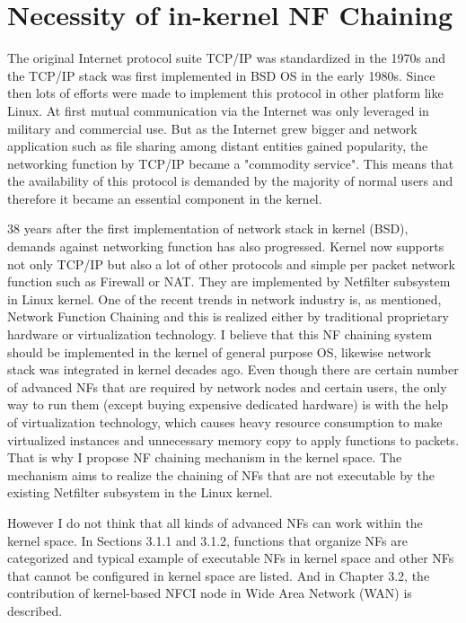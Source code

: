 \section{Necessity of in-kernel NF Chaining}
The original Internet protocol suite TCP/IP was standardized in the 1970s and the TCP/IP stack was first implemented in BSD OS in the early 1980s. Since then lots of efforts were made to implement this protocol in other platform like Linux. At first mutual communication via the Internet was only leveraged in military and commercial use. But as the Internet grew bigger and network application such as file sharing among distant entities gained popularity, the networking function by TCP/IP became a "commodity service". This means that the availability of this protocol is demanded by the majority of normal users and therefore it became an essential component in the kernel. 

 38 years after the first implementation of network stack in kernel (BSD), demands against networking function has also progressed. Kernel now supports not only TCP/IP but also a lot of other protocols and simple per packet network function such as Firewall or NAT. They are implemented by Netfilter subsystem in Linux kernel. One of the recent trends in network industry is, as mentioned, Network Function Chaining and this is realized either by traditional proprietary hardware or virtualization technology. I believe that this NF chaining system should be implemented in the kernel of general purpose OS, likewise network stack was integrated in kernel decades ago. Even though there are certain number of advanced NFs that are required by network nodes and certain users, the only way to run them (except buying expensive dedicated hardware) is with the help of virtualization technology, which causes heavy resource consumption to make virtualized instances and unnecessary memory copy to apply functions to packets. That is why I propose NF chaining mechanism in the kernel space. The mechanism aims to realize the chaining of NFs that are not executable by the existing Netfilter subsystem in the Linux kernel. 
 
 However I do not think that all kinds of advanced NFs can work within the kernel space. In Sections 3.1.1 and 3.1.2, functions that organize NFs are categorized and typical example of executable NFs in kernel space and other NFs that cannot be configured in kernel space are listed. And in Chapter 3.2, the contribution of kernel-based NFCI node in Wide Area Network (WAN) is described. 
 

